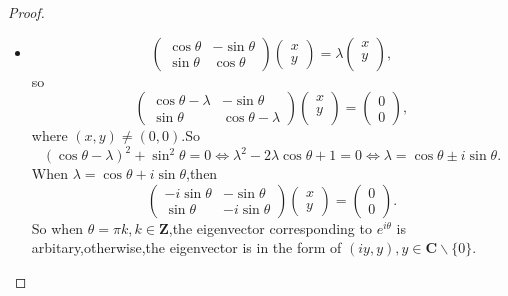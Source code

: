 ﻿\documentclass[a4paper]{article}
\begin{document}
\begin{proof}
  \begin{itemize}
  \item 
$$
\begin{pmatrix}
  \cos\theta&-\sin\theta\\
\sin\theta&\cos\theta  
\end{pmatrix}
\begin{pmatrix}
  x\\
y
\end{pmatrix}=\lambda
\begin{pmatrix}
  x\\
y\\
\end{pmatrix},
$$
so
$$
\begin{pmatrix}
  \cos\theta-\lambda&-\sin\theta\\
\sin\theta&\cos\theta-\lambda
\end{pmatrix}
\begin{pmatrix}
  x\\
y\\
\end{pmatrix}=
\begin{pmatrix}
  0\\
0
\end{pmatrix}
,
$$
where $(x,y)\neq (0,0)$.So
$$
(\cos\theta-\lambda)^2+\sin^2\theta=0\iff
\lambda^{2}-2\lambda\cos\theta+1=0\iff \lambda=\cos\theta\pm i\sin\theta.
$$
When $\lambda=\cos\theta+i\sin\theta$,then
$$
\begin{pmatrix}
-  i\sin\theta&-\sin\theta\\
\sin\theta&-i\sin\theta
\end{pmatrix}
\begin{pmatrix}
  x\\
y
\end{pmatrix}=
\begin{pmatrix}
  0\\
0
\end{pmatrix}.
$$
So when $\theta=\pi k,k\in \mathbf{Z}$,the eigenvector
corresponding to
$e^{i\theta}$ is  arbitary,otherwise,the eigenvector is in the form
of $(iy,y),y\in \mathbf{C}\backslash\{0\}$.\\


\end{itemize}
\end{proof}
\end{document}
